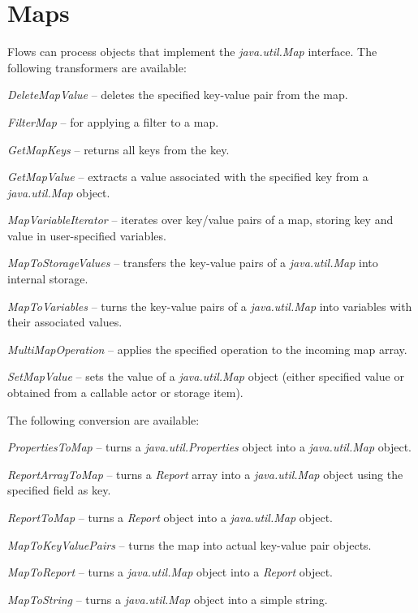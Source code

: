 \newpage
\section{Maps}
Flows can process objects that implement the \textit{java.util.Map} interface.
The following transformers are available:
\begin{tight_itemize}
	\item \textit{DeleteMapValue} -- deletes the specified key-value pair from the map.
	\item \textit{FilterMap} -- for applying a filter to a map.
	\item \textit{GetMapKeys} -- returns all keys from the key.
	\item \textit{GetMapValue} -- extracts a value associated with the
	specified key from a \textit{java.util.Map} object.
    \item \textit{MapVariableIterator} -- iterates over key/value pairs of a map,
    storing key and value in user-specified variables.
	\item \textit{MapToStorageValues} -- transfers the key-value pairs of a
	\textit{java.util.Map} into internal storage.
	\item \textit{MapToVariables} -- turns the key-value pairs of a
	\textit{java.util.Map} into variables with their associated values.
	\item \textit{MultiMapOperation} -- applies the specified operation to
	the incoming map array.
	\item \textit{SetMapValue} -- sets the value of a \textit{java.util.Map}
	object (either specified value or obtained from a callable actor or storage item).
\end{tight_itemize}
The following conversion are available:
\begin{tight_itemize}
	\item \textit{PropertiesToMap} -- turns a \textit{java.util.Properties}
	object into a \textit{java.util.Map} object.
	\item \textit{ReportArrayToMap} -- turns a \textit{Report} array into a
	\textit{java.util.Map} object using the specified field as key.
	\item \textit{ReportToMap} -- turns a \textit{Report} object into a
	\textit{java.util.Map} object.
	\item \textit{MapToKeyValuePairs} -- turns the map into actual
	key-value pair objects.
  \item \textit{MapToReport} -- turns a \textit{java.util.Map} object into a
  \textit{Report} object.
  \item \textit{MapToString} -- turns a \textit{java.util.Map} object into a
  simple string.
\end{tight_itemize}


